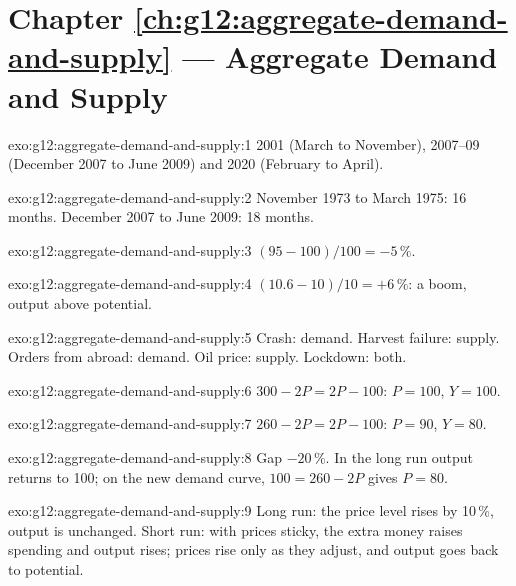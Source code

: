 \section*{Chapter \ref{ch:g12:aggregate-demand-and-supply} --- Aggregate Demand and Supply}

\begin{solution}{exo:g12:aggregate-demand-and-supply:1}
2001 (March to November), 2007--09 (December 2007 to June 2009) and 2020 (February to April).
\end{solution}

\begin{solution}{exo:g12:aggregate-demand-and-supply:2}
November 1973 to March 1975: 16 months. December 2007 to June 2009: 18 months.
\end{solution}

\begin{solution}{exo:g12:aggregate-demand-and-supply:3}
$(95 - 100)/100 = -5\,\%$.
\end{solution}

\begin{solution}{exo:g12:aggregate-demand-and-supply:4}
$(10.6 - 10)/10 = +6\,\%$: a boom, output above potential.
\end{solution}

\begin{solution}{exo:g12:aggregate-demand-and-supply:5}
Crash: demand. Harvest failure: supply. Orders from abroad: demand. Oil price: supply. Lockdown: both.
\end{solution}

\begin{solution}{exo:g12:aggregate-demand-and-supply:6}
$300 - 2P = 2P - 100$: $P = 100$, $Y = 100$.
\end{solution}

\begin{solution}{exo:g12:aggregate-demand-and-supply:7}
$260 - 2P = 2P - 100$: $P = 90$, $Y = 80$.
\end{solution}

\begin{solution}{exo:g12:aggregate-demand-and-supply:8}
Gap $-20\,\%$. In the long run output returns to 100; on the new demand curve, $100 = 260 - 2P$ gives $P = 80$.
\end{solution}

\begin{solution}{exo:g12:aggregate-demand-and-supply:9}
Long run: the price level rises by 10\,\%, output is unchanged. Short run: with prices sticky, the extra money raises spending and output rises; prices rise only as they
adjust, and output goes back to potential.
\end{solution}

